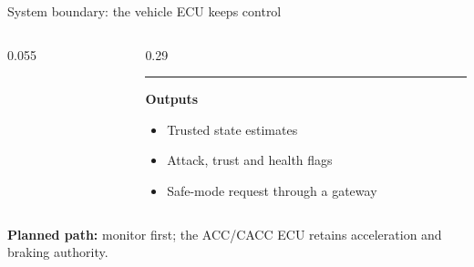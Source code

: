 \documentclass[aspectratio=169,11pt,xcolor=table]{beamer}
\newcommand{\sourcefoot}[1]{%
}
\begin{document}
\begin{frame}{System boundary: the vehicle ECU keeps control}
\begin{columns}[T,onlytextwidth]
\begin{column}{0.055\textwidth}
    \end{column}
    \begin{column}{0.29\textwidth}
      {\color{Good}\rule{\linewidth}{0.09cm}}\par
      \vspace{0.12cm}
      {\color{Good}\fontsize{12.5}{14.5}\selectfont\bfseries Outputs}\par
      \vspace{0.14cm}
      {\fontsize{9.1}{10.9}\selectfont
      \begin{itemize}
        \item Trusted state estimates
        \item Attack, trust and health flags
        \item Safe-mode request through a gateway
      \end{itemize}}
    \end{column}
  \end{columns}
  \vspace{0.18cm}
  {\color{BrandBlue}\fontsize{9.2}{11}\selectfont\bfseries Planned path:}\hspace{0.08cm}%
  {\fontsize{9.2}{11}\selectfont monitor first; the ACC/CACC ECU retains acceleration and braking authority.}
  \sourcefoot{Thesis Chapter 6, board requirements and integration roadmap}
\end{frame}
\end{document}

